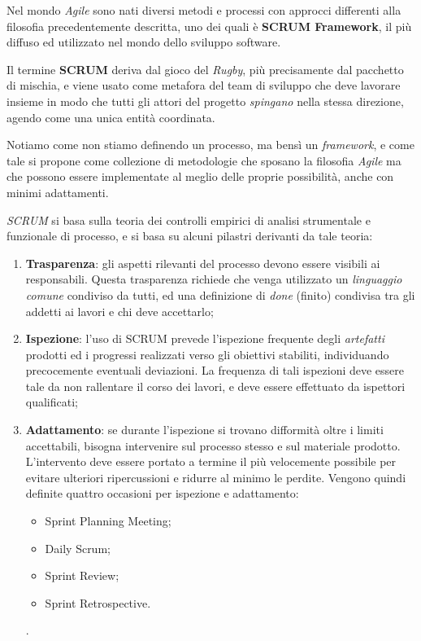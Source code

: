 \documentclass[a4paper,12pt]{report}
\begin{document}
				Nel mondo \emph{Agile} sono nati diversi metodi e processi con approcci differenti alla filosofia precedentemente descritta, uno dei quali è \textbf{SCRUM Framework}, il più diffuso ed utilizzato nel mondo dello sviluppo software.
				
				Il termine \textbf{SCRUM} deriva dal gioco del \emph{Rugby}, più precisamente dal pacchetto di mischia, e viene usato come metafora del team di sviluppo che deve lavorare insieme in modo che tutti gli attori del progetto \emph{spingano} nella stessa direzione, agendo come una unica entità coordinata.
				
				Notiamo come non stiamo definendo un processo, ma bensì un \emph{framework}, e come tale si propone come
				collezione di metodologie che sposano la filosofia \emph{Agile} ma che possono essere implementate al meglio delle proprie possibilità, anche con minimi adattamenti.
				
				\emph{SCRUM} si basa sulla teoria dei controlli empirici di analisi strumentale e funzionale di processo, e si basa su alcuni pilastri derivanti da tale teoria:
				\begin{enumerate}
					\item \textbf{Trasparenza}: gli aspetti rilevanti del processo devono essere visibili ai responsabili. Questa trasparenza richiede che venga utilizzato un \emph{linguaggio comune} condiviso da tutti, ed una definizione di
					\emph{done} (finito) condivisa tra gli addetti ai lavori e chi deve accettarlo;
					\item \textbf{Ispezione}: l'uso di SCRUM prevede l'ispezione frequente degli \emph{artefatti} prodotti ed i progressi realizzati verso gli obiettivi stabiliti, individuando precocemente eventuali deviazioni. La frequenza di tali ispezioni deve essere tale da non rallentare il corso dei lavori, e deve essere effettuato da ispettori qualificati;
					\item \textbf{Adattamento}: se durante l'ispezione si trovano difformità oltre i limiti accettabili, bisogna intervenire sul processo stesso e sul materiale prodotto. L'intervento deve essere portato a termine il più velocemente possibile per evitare ulteriori ripercussioni e ridurre al minimo le perdite. Vengono quindi definite quattro occasioni per ispezione e adattamento:
					\begin{itemize}
						\item Sprint Planning Meeting;
						\item Daily Scrum;
						\item Sprint Review;
						\item Sprint Retrospective.
					\end{itemize}.
				\end{enumerate}
			
\end{document}
